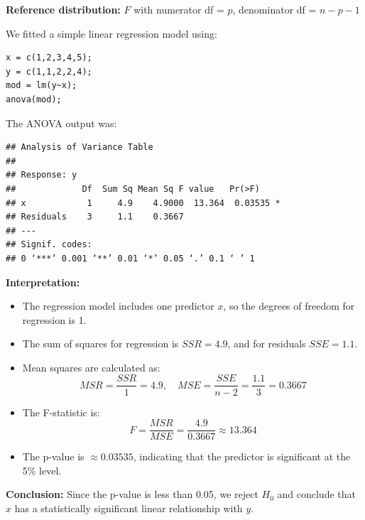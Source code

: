 \textbf{Reference distribution:}
$F$ with numerator df = $p$, denominator df = $n - p - 1$
\begin{example}

We fitted a simple linear regression model using:

\begin{tcolorbox}[colback=gray!10, colframe=black!45, arc=2mm]
\begin{verbatim}
x = c(1,2,3,4,5);
y = c(1,1,2,2,4);
mod = lm(y~x);
anova(mod);
\end{verbatim}
\end{tcolorbox}

The ANOVA output was:

\begin{tcolorbox}[colback=gray!10, colframe=black!45, arc=2mm]
\begin{verbatim}
## Analysis of Variance Table
##
## Response: y
##             Df  Sum Sq Mean Sq F value   Pr(>F)
## x            1     4.9    4.9000  13.364  0.03535 *
## Residuals    3     1.1    0.3667
## ---
## Signif. codes:
## 0 ‘***’ 0.001 ‘**’ 0.01 ‘*’ 0.05 ‘.’ 0.1 ‘ ’ 1
\end{verbatim}
\end{tcolorbox}

\textbf{Interpretation:}
\begin{itemize}
  \item The regression model includes one predictor \(x\), so the degrees of freedom for regression is 1.
  \item The sum of squares for regression is \(SSR = 4.9\), and for residuals \(SSE = 1.1\).
  \item Mean squares are calculated as:
  \[
    MSR = \frac{SSR}{1} = 4.9, \quad MSE = \frac{SSE}{n - 2} = \frac{1.1}{3} = 0.3667
  \]
  \item The F-statistic is:
  \[
    F = \frac{MSR}{MSE} = \frac{4.9}{0.3667} \approx 13.364
  \]
  \item The p-value is \( \approx 0.03535 \), indicating that the predictor is significant at the 5\% level.
\end{itemize}

\textbf{Conclusion:} Since the p-value is less than 0.05, we reject \(H_0\) and conclude that \(x\) has a statistically significant linear relationship with \(y\).

\end{example}
